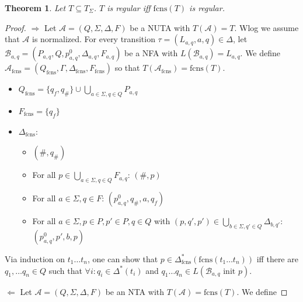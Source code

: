 \documentclass{article}
\newtheorem{theorem}{Theorem}
\begin{document}
\vspace{1cm}
\begin{theorem}
\label{fcns_correct}
	Let $T \subseteq T_\Sigma$. $T$ is regular iff $\text{fcns}(T)$ is regular.
\end{theorem}
\begin{proof}
	$\boldsymbol{\Rightarrow}$ Let $\mathcal{A} = (Q, \Sigma, \Delta, F)$ be a NUTA with $T(\mathcal{A}) = T$. Wlog we assume that $\mathcal{A}$ is normalized. For every transition $\tau = (L_{a,q}, a, q) \in \Delta$, let $\mathcal{B}_{a,q} = (P_{a,q}, Q, p^0_{a,q}, \Delta_{a,q}, F_{a,q})$ be a NFA with $L(\mathcal{B}_{a,q}) = L_{a,q}$. We define $\mathcal{A}_\text{fcns} = (Q_\text{fcns}, \Gamma, \Delta_\text{fcns}, F_\text{fcns})$ so that $T(\mathcal{A}_\text{fcns}) = \text{fcns}(T)$.
	
	\begin{itemize}
		\item $Q_\text{fcns} = \{q_f, q_\#\} \cup \bigcup\limits_{a \in \Sigma, q \in Q} P_{a, q}$
		\item $F_\text{fcns} = \{q_f\}$
		\item $\Delta_\text{fcns}$:
		\begin{itemize}
			\item $(\#, q_\#)$
			\item For all $p \in \bigcup\limits_{a \in \Sigma, q \in Q} F_{a, q}$: $(\#, p)$
			\item For all $a \in \Sigma, q \in F$: $(p^0_{a,q}, q_\#, a, q_f)$
			\item For all $a \in \Sigma, p \in P, p' \in P, q \in Q$ with $(p, q', p') \in \bigcup\limits_{b \in \Sigma, q' \in Q} \Delta_{b, q'}$: $(p^0_{a,q}, p', b, p)$
		\end{itemize}
	\end{itemize}
	
	Via induction on $t_1 \dots t_n$, one can show that $p \in \Delta^*_\text{fcns}(\text{fcns}(t_1 \dots t_n))$ iff there are $q_1, \dots q_n \in Q$ such that $\forall i: q_i \in \Delta^*(t_i)$ and $q_1 \dots q_n \in L(\mathcal{B}_{a,q} \text{ init } p)$.
	
	$\boldsymbol{\Leftarrow}$ Let $\mathcal{A} = (Q, \Sigma, \Delta, F)$ be an NTA with $T(\mathcal{A}) = \text{fcns}(T)$. We define %
\end{proof}




\newpage
\end{document}

